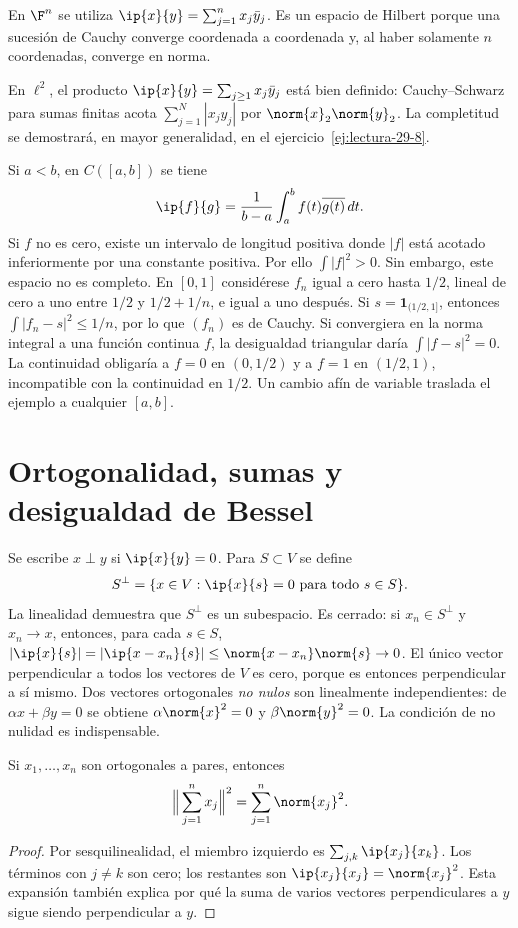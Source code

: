 \begin{ejemplo}
En $\F^{n}$ se utiliza $\ip{x}{y}=\sum_{j=1}^{n}x_j\bar y_j$. Es un espacio de Hilbert porque una sucesión de Cauchy converge coordenada a coordenada y, al haber solamente $n$ coordenadas, converge en norma.

En $\ell^{2}$, el producto $\ip{x}{y}=\sum_{j\geq1}x_j\bar y_j$ está bien definido: Cauchy--Schwarz para sumas finitas acota $\sum_{j=1}^{N}|x_jy_j|$ por $\norm{x}_2\norm{y}_2$. La completitud se demostrará, en mayor generalidad, en el ejercicio~\ref{ej:lectura-29-8}.

Si $a<b$, en $C([a,b])$ se tiene
\[
 \ip{f}{g}=\frac1{b-a}\int_a^b f(t)\overline{g(t)}\,dt.
\]
Si $f$ no es cero, existe un intervalo de longitud positiva donde $|f|$ está acotado inferiormente por una constante positiva. Por ello $\int|f|^{2}>0$. Sin embargo, este espacio no es completo. En $[0,1]$ considérese $f_n$ igual a cero hasta $1/2$, lineal de cero a uno entre $1/2$ y $1/2+1/n$, e igual a uno después. Si $s=\mathbf1_{(1/2,1]}$, entonces $\int|f_n-s|^{2}\leq1/n$, por lo que $(f_n)$ es de Cauchy. Si convergiera en la norma integral a una función continua $f$, la desigualdad triangular daría $\int|f-s|^{2}=0$. La continuidad obligaría a $f=0$ en $(0,1/2)$ y a $f=1$ en $(1/2,1)$, incompatible con la continuidad en $1/2$. Un cambio afín de variable traslada el ejemplo a cualquier $[a,b]$.
\end{ejemplo}

\section{Ortogonalidad, sumas y desigualdad de Bessel}
Se escribe $x\perp y$ si $\ip{x}{y}=0$. Para $S\subset V$ se define
\[
 S^{\perp}=\{x\in V:\ip{x}{s}=0\text{ para todo }s\in S\}.
\]
La linealidad demuestra que $S^{\perp}$ es un subespacio. Es cerrado: si $x_n\in S^{\perp}$ y $x_n\to x$, entonces, para cada $s\in S$,
$|\ip{x}{s}|=|\ip{x-x_n}{s}|\leq\norm{x-x_n}\norm{s}\to0$.
El único vector perpendicular a todos los vectores de $V$ es cero, porque es entonces perpendicular a sí mismo. Dos vectores ortogonales \emph{no nulos} son linealmente independientes: de $\alpha x+\beta y=0$ se obtiene $\alpha\norm{x}^{2}=0$ y $\beta\norm{y}^{2}=0$. La condición de no nulidad es indispensable.

\begin{teorema}[Pitágoras]\label{ch29:pitagoras}
Si $x_1,\dots,x_n$ son ortogonales a pares, entonces
\[
 \Big\|\sum_{j=1}^{n}x_j\Big\|^{2}=\sum_{j=1}^{n}\norm{x_j}^{2}.
\]
\end{teorema}
\begin{proof}
Por sesquilinealidad, el miembro izquierdo es $\sum_{j,k}\ip{x_j}{x_k}$. Los términos con $j\ne k$ son cero; los restantes son $\ip{x_j}{x_j}=\norm{x_j}^{2}$. Esta expansión también explica por qué la suma de varios vectores perpendiculares a $y$ sigue siendo perpendicular a $y$.
\end{proof}

